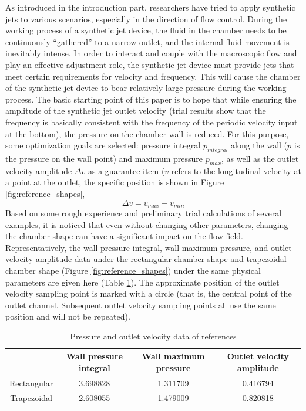 \documentclass{article}
\begin{document}
As introduced in the introduction part, researchers have tried to apply synthetic jets to various scenarios, especially in the direction of flow control.
During the working process of a synthetic jet device, the fluid in the chamber needs to be continuously ``gathered'' to a narrow outlet,
and the internal fluid movement is inevitably intense. In order to interact and couple with the macroscopic flow and play an effective adjustment role,
the synthetic jet device must provide jets that meet certain requirements for velocity and frequency.
This will cause the chamber of the synthetic jet device to bear relatively large pressure during the working process.
The basic starting point of this paper is to hope that while ensuring the amplitude of the synthetic jet outlet velocity (trial results show that the frequency is basically consistent with the frequency of the periodic velocity input at the bottom),
the pressure on the chamber wall is reduced.
For this purpose, some optimization goals are selected: pressure integral $p_{integral}$ along the wall ($p$ is the pressure on the wall point) and maximum pressure $p_{max}$,
as well as the outlet velocity amplitude $\Delta v$ as a guarantee item ($v$ refers to the longitudinal velocity at a point at the outlet,
the specific position is shown in Figure \ref{fig:reference_shapes},
\begin{equation}\Delta v = v_{max} - v_{min}\end{equation}
Based on some rough experience and preliminary trial calculations of several examples, it is noticed that even without changing other parameters,
changing the chamber shape can have a significant impact on the flow field.
Representatively, the wall pressure integral, wall maximum pressure, and outlet velocity amplitude data under the rectangular chamber shape and trapezoidal chamber shape (Figure \ref{fig:reference_shapes}) under the same physical parameters are given here (Table \ref{tab:pressure_and_outlet_velocity_data_of_references}).
The approximate position of the outlet velocity sampling point is marked with a circle (that is, the central point of the outlet channel. Subsequent outlet velocity sampling points all use the same position and will not be repeated).

\begin{table}[h]
    \centering
    \caption{Pressure and outlet velocity data of references}
    \label{tab:pressure_and_outlet_velocity_data_of_references}
    \begin{tabular}{c c c c}
        \hline
        \hline
        &{Wall pressure integral}&{Wall maximum pressure}&{Outlet velocity amplitude}\\
        \hline
        {Rectangular}&{3.698828}&{1.311709}&{0.416794}\\
        \hline
        {Trapezoidal}&{2.608055}&{1.479009}&{0.820818}\\
        \hline
        \hline
    \end{tabular}
\end{table}
\end{document}
